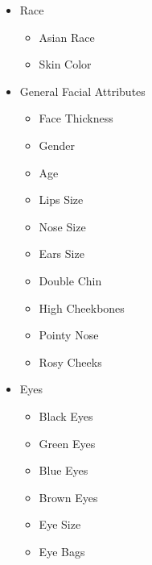 \begin{itemize}
    \item Race
    \begin{itemize}
    	 \item Asian Race                   \hspace*{\fill Binary}
    	 \item Skin Color                   \hspace*{\fill Continuous}
    \end{itemize}


    \item General Facial Attributes
    \begin{itemize}
    	 \item Face Thickness               \hspace*{\fill Continuous}
    	 \item Gender                       \hspace*{\fill Binary}
    	 \item Age                          \hspace*{\fill Continuous}
    	 \item Lips Size                    \hspace*{\fill Continuous}
    	 \item Nose Size                    \hspace*{\fill Continuous}
    	 \item Ears Size                    \hspace*{\fill Continuous}
    	 \item Double Chin                  \hspace*{\fill Binary}
    	 \item High Cheekbones              \hspace*{\fill Binary}   
    	 \item Pointy Nose                  \hspace*{\fill Binary}
    	 \item Rosy Cheeks                  \hspace*{\fill Binary}
    \end{itemize}


    \item Eyes
    \begin{itemize}
    	 \item Black Eyes                   \hspace*{\fill Binary}
    	 \item Green Eyes                   \hspace*{\fill Binary}
    	 \item Blue Eyes                    \hspace*{\fill Binary}
    	 \item Brown Eyes                   \hspace*{\fill Binary}
    	 \item Eye Size                     \hspace*{\fill Continuous}
    	 \item Eye Bags                     \hspace*{\fill Binary}
    \end{itemize}



\end{itemize}
